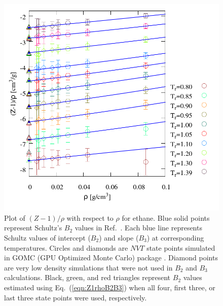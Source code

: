 \documentclass[5p,times]{elsarticle}
\begin{document}
\begin{figure}
\includegraphics[scale=0.3]{Figures/TraPPE-C2-Z1rho.png}
\caption{Plot of $(Z-1)/\rho$ with respect to $\rho$ for ethane. Blue solid points represent Schultz's $B_2$ values in Ref.~\cite{Ahunbay2004}. Each blue line represents Schultz values of intercept ($B_2$) and slope ($B_3$) at corresponding temperatures. Circles and diamonds are $NVT$ state points simulated in GOMC (GPU Optimized Monte Carlo) package \cite{Mick2013}. Diamond points are very low density simulations that were not used in $B_2$ and $B_3$ calculations. Black, green, and red triangles represent $B_2$ values estimated using Eq.~(\ref{eqn:Z1rhoB2B3}) when all four, first three, or last three state points were used, respectively.}
\label{fig:TraPPE-C2-Z1rho}
\end{figure}
\end{document}
